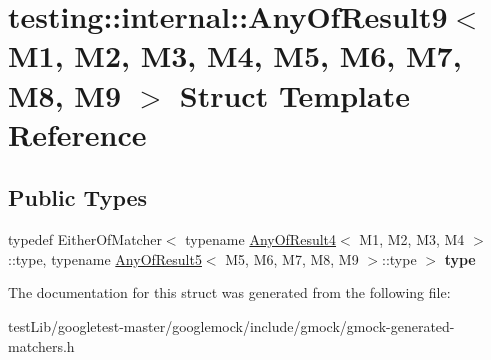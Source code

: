 \hypertarget{structtesting_1_1internal_1_1AnyOfResult9}{}\section{testing\+:\+:internal\+:\+:Any\+Of\+Result9$<$ M1, M2, M3, M4, M5, M6, M7, M8, M9 $>$ Struct Template Reference}
\label{structtesting_1_1internal_1_1AnyOfResult9}
\subsection*{Public Types}
\begin{DoxyCompactItemize}
\item 
\mbox{\label{structtesting_1_1internal_1_1AnyOfResult9_a308935fb02c62f502044dcc7b0a2b464}} 
typedef Either\+Of\+Matcher$<$ typename \hyperlink{structtesting_1_1internal_1_1AnyOfResult4}{Any\+Of\+Result4}$<$ M1, M2, M3, M4 $>$\+::type, typename \hyperlink{structtesting_1_1internal_1_1AnyOfResult5}{Any\+Of\+Result5}$<$ M5, M6, M7, M8, M9 $>$\+::type $>$ {\bfseries type}
\end{DoxyCompactItemize}


The documentation for this struct was generated from the following file\+:\begin{DoxyCompactItemize}
\item 
test\+Lib/googletest-\/master/googlemock/include/gmock/gmock-\/generated-\/matchers.\+h\end{DoxyCompactItemize}
